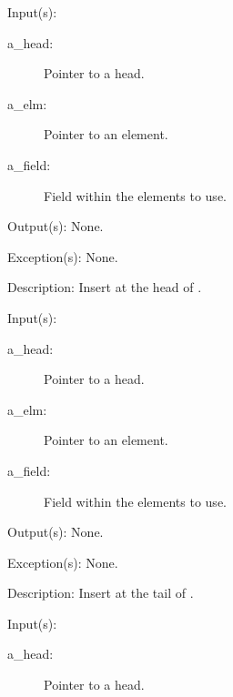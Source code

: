\begin{capi}
	\begin{capilist}
	\item[Input(s): ]
		\begin{description}\item[]
		\item[a\_head: ]
			Pointer to a  head.
		\item[a\_elm: ]
			Pointer to an element.
		\item[a\_field: ]
			Field within the  elements to use.
		\end{description}
	\item[Output(s): ] None.
	\item[Exception(s): ] None.
	\item[Description: ]
		Insert  at the head of .
	\end{capilist}
\label{ql_tail_insert}
	\begin{capilist}
	\item[Input(s): ]
		\begin{description}\item[]
		\item[a\_head: ]
			Pointer to a \classname{ql} head.
		\item[a\_elm: ]
			Pointer to an element.
		\item[a\_field: ]
			Field within the  elements to use.
		\end{description}
	\item[Output(s): ] None.
	\item[Exception(s): ] None.
	\item[Description: ]
		Insert  at the tail of \cvar{a\_head}.
	\end{capilist}
\label{ql_remove}
	\begin{capilist}
	\item[Input(s): ]
		\begin{description}\item[]
		\item[a\_head: ]
			Pointer to a  head.

\end{description}
\end{capilist}
\end{capi}
